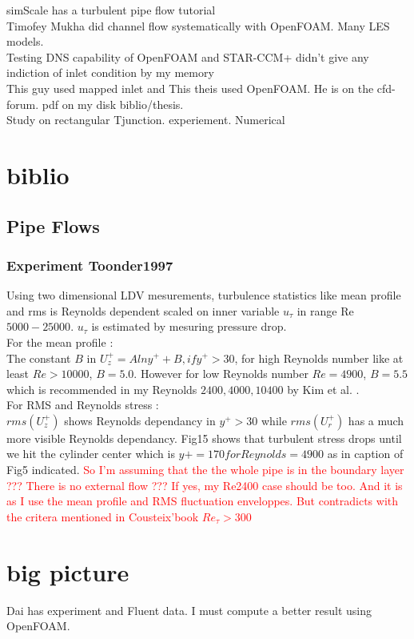\documentclass[a4paper,10pt]{article}
\begin{document}
simScale has a turbulent pipe flow tutorial \\

Timofey Mukha did channel flow systematically with OpenFOAM. Many LES models.\\

Testing DNS capability of OpenFOAM and STAR-CCM+ didn't give any indiction of inlet condition by my memory \\

This guy \cite{EugeneThesis2006} used mapped inlet and This theis used OpenFOAM. He is on the cfd-forum. pdf on my disk biblio/thesis.\\

Study on rectangular Tjunction. \cite{Fukushima2002} experiement. Numerical \cite{Georgiou2017}

\section{biblio}
\subsection{Pipe Flows}
\subsubsection{Experiment Toonder1997 \cite{Toonder1997}}
Using two dimensional LDV mesurements, turbulence statistics like mean profile and rms is Reynolds dependent scaled on inner variable $u_\tau$ in range Re $5000 -25000$. $u_\tau$ is estimated by mesuring pressure drop. \\

For the mean profile :\\
The constant $B$ in $U^+_z = Alny^++B, if y^+>30$, for high Reynolds number like at least $Re>10000$, $B=5.0$. However for low Reynolds number $Re=4900$, $B=5.5$ which is recommended in my Reynolds $2400, 4000, 10400$ by Kim et al. \cite{KJM1987}. \\

For RMS and Reynolds stress : \\
$rms(U^+_z)$ shows Reynolds dependancy in $y^+ > 30$ while $rms(U^+_r)$ has a much more visible Reynolds dependancy. Fig15 shows that turbulent stress drops until we hit the cylinder center which is $y+=170 for Reynolds=4900$ as in caption of Fig5 indicated. \textcolor{red}{So I'm assuming that the the whole pipe is in the boundary layer ??? There is no external flow ??? If yes, my Re2400 case should be too. And it is as I use the mean profile and RMS fluctuation enveloppes. But contradicts with the critera mentioned in Cousteix'book $Re_{\tau} > 300$}

\section{big picture}
Dai has experiment and Fluent data. I must compute a better result using OpenFOAM.\\




\newpage


\end{document}
